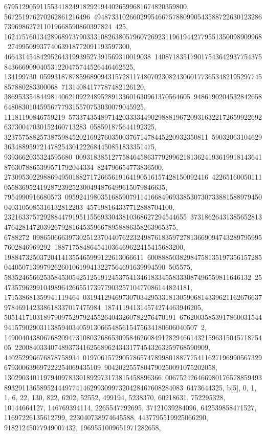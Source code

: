 {{{679512905911553418249182921944026599681674820359800, 567251976270262861216496\
49487331026602995466757880990543588722630123286739698627211019668590860397824\
425, 162475760134289689737903331082638057960726923119619442779551350098909968\
2749950993774063918772091193597300, 46643145484295264319939527391569310019038\
140871835179017543642937754375843666909040531220475744526446462525, 134199730\
05993187878596890943157281174807023082430601773653482195297745857880283300068\
71314084177787482126120, 3869533548449814062109224895289133601630961370564605\
9486190204532842658648083010459567779315570753030079045925, 11181190846759219\
57337435489714203333449029888196720931632217265992269263730047030152460713283\
058591875644192325, 323757588257387598452021692760350037671478445220932350811\
59032063104629363488959721478254301222684450851833351475, 9393662035324595680\
00931838512775846458637792996218136241936199181436418763078865399571792044334\
824796654773836500, 273095302298869495018827172665619164190516157428150092416\
42265160050111055836952419287239252300494876499615079846635, 7954990916680573\
09592419803516859079114166849693385307307338815889794500403105085316132812203\
457198164337712888704100, 232163375729288447919511556933043810368627294544655\
37318626431385652813476428147203926792816453596678958886358263965375, 6788272\
09865066639730251237044076223249876183597278136690947432897959957602846969292\
188717584864541036469622415415683200, 198847325037204141355465999122613066611\
60088850382984758135197356157285044050713997926260106199413227564691639994590\
505575, 583524656625358453054251251912453754134618334558333087496559811646132\
254735796299104989642665517397790325710477086144824181, 171538681359941119464\
03194129469730703429533181305906814339621162676637978469142338618337017475984\
187411941314574274463946205, 505141710318979097529792455264043260782276470191\
67620035853917860031544941579029031138594034059130665485615475634180606040507\
2, 14900404380676820947310803268653095846260849128294661432159631504571875405\
220084033407489373416256896243431774543263259768590909, 440252996676878758934\
01970615729057865747899801887775411627196990567329679300639697222254069435109\
9042022557804790250091075202058, 13029034011979409783301892973173815458896366\
00675242646698017657885949389329113658952444977414629930997320428467608284083\
6473644325}}, {b[5], {0, 1, 1, 6, 22, 130, 822, 6202, 52552, 499194, 5238370, 
   60218631, 752295328, 10144664127, 146769394114, 2265547792695, 
   37121039284096, 642539858471527, 11697226135612799, 223040738974645588, 
   4437795519925066290, 91821245077949007432, 1969551009651971282658, 
}}}
